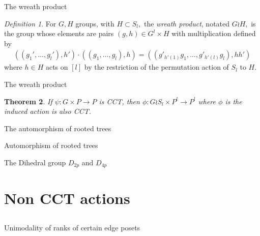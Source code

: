 \documentclass{beamer}
\newtheorem{thm}{Theorem}
\theoremstyle{remark}
\newtheorem{defn}[thm]{Definition}
\begin{document}
\begin{frame}{The wreath product}
\begin{defn}
For $G, H$ groups, with $H \subset S_l,$ the {\it wreath product}, notated $G \wr H,$ is the group whose elements are pairs $(g,h) \in G^l\times H$ with multiplication defined by
\begin{align*}
((g_1',\ldots, g_l'),h') \cdot ((g_1,\ldots, g_l) ,h) =((g'_{h'(1)}g_1,\ldots, g'_{h'(l)}g_l),hh')
\end{align*}
where $h \in H$ acts on $[l]$ by the restriction of the permutation action of $S_l$ to $H.$
\end{defn}
\end{frame}



\begin{frame}{The wreath product}
\begin{thm}
\label{thm:wreath_preservation}
If $\psi:G\times P \rightarrow P$ is CCT, then $\phi:G\wr S_l \times P^l \rightarrow P^l$ where $\phi$ is the induced action is also CCT.
\end{thm}
\end{frame}



\begin{frame}{The automorphism of rooted trees}

\end{frame}





\begin{frame}{Automorphism of rooted trees}

\end{frame}






\begin{frame}{The Dihedral group $D_{2p}$ and $D_{4p}$}

\end{frame}







\section{Non CCT actions}
\subsection{}
\begin{frame}{Unimodality of ranks of certain edge posets}


\end{frame}
\end{document}
